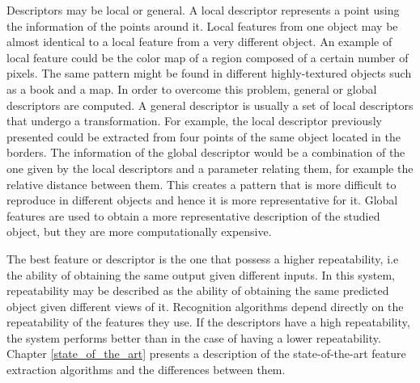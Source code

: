 Descriptors may be local or general. 
A local descriptor represents a point using the information of the points around it. 
Local features from one object may be almost identical to a local feature from a very different object. 
An example of local feature could be the color map of a region composed of a certain number of pixels. 
The same pattern might be found in different highly-textured objects such as a book and a map. 
In order to overcome this problem, general or global descriptors are computed. 
A general descriptor is usually a set of local descriptors that undergo a transformation. 
For example, the local descriptor previously presented could be extracted from four points of the same object located in the borders. 
The information of the global descriptor would be a combination of the one given by the local descriptors and a parameter relating them, for example the relative distance between them. 
This creates a pattern that is more difficult to reproduce in different objects and hence it is more representative for it. 
Global features are used to obtain a more representative description of the studied object, but they are more computationally expensive. 
\\
\newpage

The best feature or descriptor is the one that possess a higher repeatability, i.e the ability of obtaining the same output given different inputs. 
In this system, repeatability may be described as the ability of obtaining the same predicted object given different views of it. 
Recognition algorithms depend directly on the repeatability of the features they use. 
If the descriptors have a high repeatability, the system performs better than in the case of having a lower repeatability. 
Chapter \ref{state_of_the_art} presents a description of the state-of-the-art feature extraction algorithms and the differences between them. 
